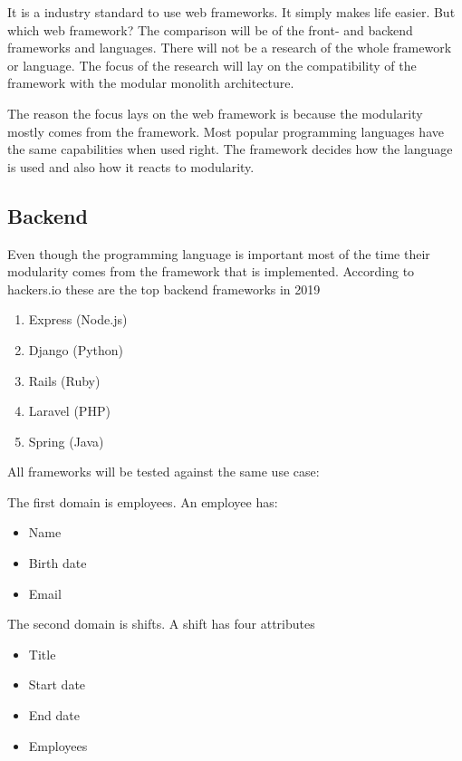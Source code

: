 It is a industry standard to use web frameworks. It simply makes life easier. But which web framework? The comparison will be of the front- and backend frameworks and languages. There will not be a research of the whole framework or language. The focus of the research will lay on the compatibility of the framework with the modular monolith architecture.

The reason the focus lays on the web framework is because the modularity mostly comes from the framework. Most popular programming languages have the same capabilities when used right. The framework decides how the language is used and also how it reacts to modularity.

\subsection{Backend}
\label{sec:BackendImplementation}

Even though the programming language is important most of the time their modularity comes from the framework that is implemented. According to hackers.io these are the top backend frameworks in 2019 \cite{topFrameworks}

\begin{enumerate}
    \item Express (Node.js)
    \item Django (Python)
    \item Rails (Ruby)
    \item Laravel (PHP)
    \item Spring (Java)
\end{enumerate}

All frameworks will be tested against the same use case:

The first domain is employees. An employee has:
\begin{itemize}
    \item Name
    \item Birth date
    \item Email
\end{itemize}

The second domain is shifts. A shift has four attributes
\begin{itemize}
    \item Title
    \item Start date
    \item End date
    \item Employees
\end{itemize}

